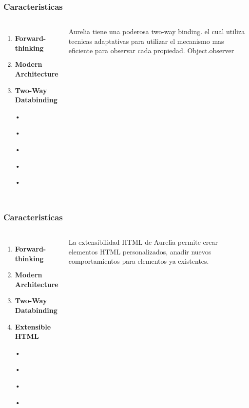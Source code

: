 \documentclass{beamer}
\begin{document}
\begin{frame}
\frametitle{Caracteristicas}
\begin{columns}[c] %

\begin{enumerate}
\item \textbf{Forward-thinking}
\item \textbf{Modern Architecture}
\item \textbf{Two-Way Databinding}
\item[•]
\item[•]
\item[•]
\item[•]
\item[•]
\end{enumerate}

Aurelia tiene una poderosa two-way binding. el cual utiliza tecnicas adaptativas para utilizar el mecanismo mas eficiente para observar cada propiedad. Object.observer
\end{columns}
\end{frame}

\begin{frame}
\frametitle{Caracteristicas}
\begin{columns}[c] %

\begin{enumerate}
\item \textbf{Forward-thinking}
\item \textbf{Modern Architecture}
\item \textbf{Two-Way Databinding}
\item \textbf{Extensible HTML}
\item[•]
\item[•]
\item[•]
\item[•]
\end{enumerate}

La extensibilidad HTML de Aurelia permite crear elementos HTML personalizados, anadir nuevos comportamientos para elementos ya existentes.
\end{columns}
\end{frame}
\end{document}
